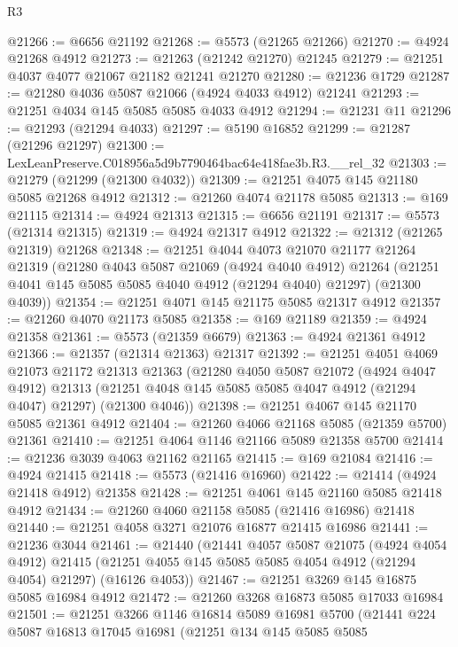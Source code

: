 \begin{lexlean}{R3}
\begin{coremodule}
@21266 := @6656 @21192
@21268 := @5573 (@21265 @21266)
@21270 := @4924 @21268 @4912
@21273 := @21263 (@21242 @21270) @21245
@21279 := @21251 @4037 @4077 @21067 @21182 @21241 @21270
@21280 := @21236 @1729
@21287 := @21280 @4036 @5087 @21066 (@4924 @4033 @4912) @21241
@21293 := @21251 @4034 @145 @5085 @5085 @4033 @4912
@21294 := @21231 @11
@21296 := @21293 (@21294 @4033)
@21297 := @5190 @16852
@21299 := @21287 (@21296 @21297)
@21300 := LexLeanPreserve.C018956a5d9b7790464bac64e418fae3b.R3.__rel_32
@21303 := @21279 (@21299 (@21300 @4032))
@21309 := @21251 @4075 @145 @21180 @5085 @21268 @4912
@21312 := @21260 @4074 @21178 @5085
@21313 := @169 @21115
@21314 := @4924 @21313
@21315 := @6656 @21191
@21317 := @5573 (@21314 @21315)
@21319 := @4924 @21317 @4912
@21322 := @21312 (@21265 @21319) @21268
@21348 := @21251
    @4044
    @4073
    @21070
    @21177
    @21264
    @21319
    (@21280
      @4043
      @5087
      @21069
      (@4924 @4040 @4912)
      @21264
      (@21251 @4041 @145 @5085 @5085 @4040 @4912 (@21294 @4040) @21297)
      (@21300 @4039))
@21354 := @21251 @4071 @145 @21175 @5085 @21317 @4912
@21357 := @21260 @4070 @21173 @5085
@21358 := @169 @21189
@21359 := @4924 @21358
@21361 := @5573 (@21359 @6679)
@21363 := @4924 @21361 @4912
@21366 := @21357 (@21314 @21363) @21317
@21392 := @21251
    @4051
    @4069
    @21073
    @21172
    @21313
    @21363
    (@21280
      @4050
      @5087
      @21072
      (@4924 @4047 @4912)
      @21313
      (@21251 @4048 @145 @5085 @5085 @4047 @4912 (@21294 @4047) @21297)
      (@21300 @4046))
@21398 := @21251 @4067 @145 @21170 @5085 @21361 @4912
@21404 := @21260 @4066 @21168 @5085 (@21359 @5700) @21361
@21410 := @21251 @4064 @1146 @21166 @5089 @21358 @5700
@21414 := @21236 @3039 @4063 @21162 @21165
@21415 := @169 @21084
@21416 := @4924 @21415
@21418 := @5573 (@21416 @16960)
@21422 := @21414 (@4924 @21418 @4912) @21358
@21428 := @21251 @4061 @145 @21160 @5085 @21418 @4912
@21434 := @21260 @4060 @21158 @5085 (@21416 @16986) @21418
@21440 := @21251 @4058 @3271 @21076 @16877 @21415 @16986
@21441 := @21236 @3044
@21461 := @21440
    (@21441
      @4057
      @5087
      @21075
      (@4924 @4054 @4912)
      @21415
      (@21251 @4055 @145 @5085 @5085 @4054 @4912 (@21294 @4054) @21297)
      (@16126 @4053))
@21467 := @21251 @3269 @145 @16875 @5085 @16984 @4912
@21472 := @21260 @3268 @16873 @5085 @17033 @16984
@21501 := @21251
    @3266
    @1146
    @16814
    @5089
    @16981
    @5700
    (@21441
      @224
      @5087
      @16813
      @17045
      @16981
      (@21251
        @134
        @145
        @5085
        @5085

\end{coremodule}
\end{lexlean}

